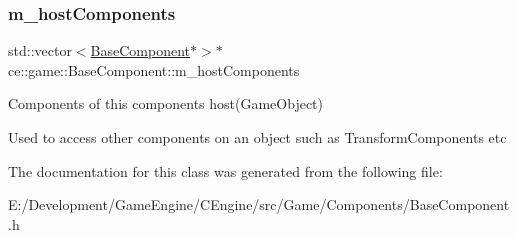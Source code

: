\subsubsection{\texorpdfstring{m\+\_\+host\+Components}{m\_hostComponents}}
{\footnotesize\ttfamily std\+::vector$<$\hyperlink{classce_1_1game_1_1_base_component}{Base\+Component}$\ast$$>$$\ast$ ce\+::game\+::\+Base\+Component\+::m\+\_\+host\+Components\hspace{0.3cm}{\ttfamily [protected]}}



Components of this components host(\+Game\+Object) 

Used to access other components on an object such as Transform\+Components etc 

The documentation for this class was generated from the following file\+:\begin{DoxyCompactItemize}
\item 
E\+:/\+Development/\+Game\+Engine/\+C\+Engine/src/\+Game/\+Components/Base\+Component.\+h\end{DoxyCompactItemize}
